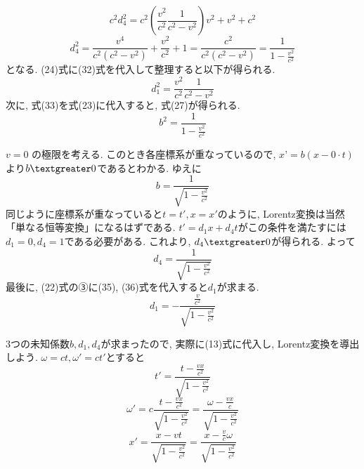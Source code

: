 \documentclass{ltjsarticle}
\begin{document}
\begin{equation}
  c^2 d_4^2 =  c^2 (\frac{v^2}{c^2} \frac{1}{c^2 - v^2}) v^2 + v^2 + c^2
\end{equation}
\begin{equation}
  d_4^2 =  \frac{v^4}{c^2(c^2 - v^2)} + \frac{v^2}{c^2} + 1 = \frac{c^2}{c^2(c^2 - v^2)} = \frac{1}{1 - \frac{v^2}{c^2}}
\end{equation}
となる. 
(24)式に(32)式を代入して整理すると以下が得られる. 
\begin{equation}
  d_1^2=\frac{v^2}{c^2}\frac{1}{c^2-v^2}
\end{equation}
次に, 式(33)を式(23)に代入すると, 式(27)が得られる. 
\begin{equation}
  b^2=\frac{1}{1-\frac{v^2}{c^2}}
\end{equation}

$v = 0$ の極限を考える. 
このとき各座標系が重なっているので,  $x’= b (x - 0 \cdot t)$より$b \textgreater 0$であるとわかる. ゆえに
\begin{equation}
  b=\frac{1}{\sqrt{1-\frac{v^2}{c^2}}}
\end{equation}
同じように座標系が重なっていると$t = t', x = x'$のように, Lorentz変換は当然「単なる恒等変換」になるはずである. 
$t' = d_1 x +d_4 t$がこの条件を満たすには $d_1 = 0, d_4 = 1$である必要がある. 
これより,  $d_4 \textgreater 0$が得られる. よって
\begin{equation}
  d_4 = \frac{1}{\sqrt{1 - \frac{v^2}{c^2}}}
\end{equation}
最後に, (22)式の③に(35), (36)式を代入すると$d_1$が求まる. 
\begin{equation}
  d_1=-\frac{\frac{v}{c^2}}{\sqrt{1-\frac{v^2}{c^2}}} 
\end{equation}

3つの未知係数$b, d_1, d_4$が求まったので, 実際に(13)式に代入し, Lorentz変換を導出しよう. 
$\omega = ct , \omega' = ct' $とすると
\begin{equation}
  t' = \frac{t - \frac{vx}{c^2}}{\sqrt{1 - \frac{v^2}{c^2}}}
\end{equation}
\begin{equation}
  \omega' = c \frac{t - \frac{vx}{c^2}}{\sqrt{1 - \frac{v^2}{c^2}}} = \frac{\omega - \frac{vx}{c}}{\sqrt{1 - \frac{v^2}{c^2}}}
\end{equation}
\begin{equation}
  x' = \frac{x - vt}{\sqrt{1 - \frac{v^2}{c^2}}} = \frac{x - \frac{v}{c}\omega}{\sqrt{1 - \frac{v^2}{c^2}}}
\end{equation}
\end{document}
